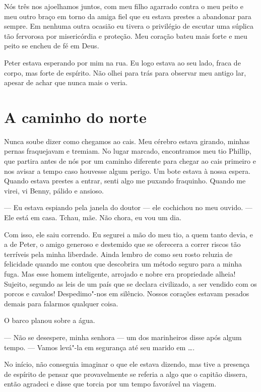 Nós três nos ajoelhamos juntos, com meu filho agarrado contra o meu
peito e meu outro braço em torno da amiga fiel que eu estava prestes a
abandonar para sempre. Em nenhuma outra ocasião eu tivera o privilégio
de escutar uma súplica tão fervorosa por misericórdia e proteção. Meu
coração bateu mais forte e meu peito se encheu de fé em Deus.

Peter estava esperando por mim na rua.
Eu logo estava ao seu lado, fraca de corpo, mas forte de espírito. Não \enlargethispage{\textheight}
olhei para trás para observar meu antigo lar, apesar de achar que nunca
mais o veria.

\chapter*{A caminho do norte}

Nunca soube dizer como chegamos ao
cais. Meu cérebro estava girando, minhas pernas fraquejavam e tremiam.
No lugar marcado, encontramos meu tio Phillip, que partira antes de nós
por um caminho diferente para chegar ao cais primeiro e nos avisar a
tempo caso houvesse algum perigo. Um bote estava à nossa espera. Quando
estava prestes a entrar, senti algo me puxando fraquinho. Quando me
virei, vi Benny, pálido e ansioso.

--- Eu estava espiando pela janela do doutor --- ele cochichou no meu
ouvido. --- Ele está em casa. Tchau, mãe. Não chora, eu vou um dia.

Com isso, ele saiu correndo. Eu segurei a mão do meu tio, a quem tanto
devia, e a de Peter, o amigo generoso e destemido que se oferecera a
correr riscos tão terríveis pela minha liberdade. Ainda lembro de como
seu rosto reluzia de felicidade quando me contou que descobrira um
método seguro para a minha fuga. Mas esse homem inteligente, arrojado e
nobre era propriedade alheia! Sujeito, segundo as leis de um país que se
declara civilizado, a ser vendido com os porcos e cavalos! Despedimo"-nos
em silêncio. Nossos corações estavam pesados demais para falarmos
qualquer coisa.

O barco planou sobre a água.

--- Não se desespere, minha senhora --- um dos marinheiros disse após
algum tempo. --- Vamos levá"-la em segurança até seu marido em \ldots{}.

No início, não conseguia imaginar o que ele estava dizendo, mas tive a
presença de espírito de pensar que provavelmente se referia a algo que o
capitão dissera, então agradeci e disse que torcia por um tempo
favorável na viagem.

